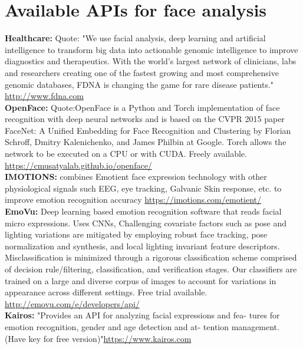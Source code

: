 \section{Available APIs for face analysis}

\textbf{Healthcare:} 
Quote: "We use facial analysis, deep learning and artificial intelligence to transform big data into actionable genomic intelligence to improve diagnostics and therapeutics. With the world’s largest network of clinicians, labs and researchers creating one of the fastest growing and most comprehensive genomic databases, FDNA is changing the game for rare disease patients."
\url{http://www.fdna.com}\\


\textbf{OpenFace:}
Quote:OpenFace is a Python and Torch implementation of face recognition with deep neural networks and is based on the CVPR 2015 paper FaceNet: A Unified Embedding for Face Recognition and Clustering by Florian Schroff, Dmitry Kalenichenko, and James Philbin at Google. Torch allows the network to be executed on a CPU or with CUDA. Freely available. \url{https://cmusatyalab.github.io/openface/}\\

\textbf{IMOTIONS:} combines Emotient face expression technology with other physiological signals such EEG, eye tracking, Galvanic Skin response, etc. to improve emotion recognition accuracy
\url{https://imotions.com/emotient/}\\

\textbf{EmoVu:} Deep learning based emotion recognition software that reads facial micro expressions. Uses CNNs, Challenging covariate factors such as pose and lighting variations are mitigated by employing robust face tracking, pose normalization and synthesis, and local lighting invariant feature descriptors. Misclassification is minimized through a rigorous classification scheme comprised of decision rule/filtering, classification, and verification stages. Our classifiers are trained on a large and diverse corpus of images to account for variations in appearance across different settings. Free trial available.
\url{http://emovu.com/e/developers/api/} \\

\textbf{Kairos:} "Provides an API for analyzing facial expressions and fea- tures for emotion recognition, gender and age detection and at- tention management. (Have key for free version)"\url{https://www.kairos.com}\\


